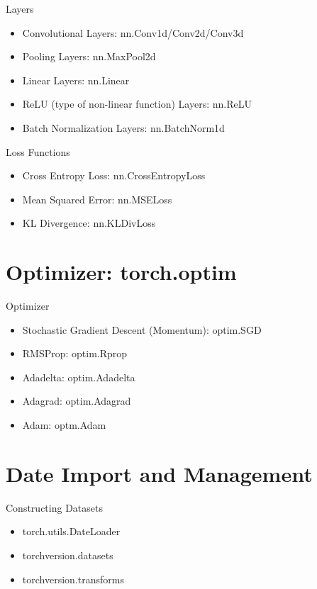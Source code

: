 \documentclass[english, nochinese]{../TeXTemplate/pkuslide}
\begin{document}
\begin{frame}
\sectionpage
\end{frame}

\begin{frame}{Layers}
\begin{itemize}
	\item Convolutional Layers: nn.Conv1d/Conv2d/Conv3d
	\item Pooling Layers: nn.MaxPool2d
	\item Linear Layers: nn.Linear
	\item ReLU (type of non-linear function) Layers: nn.ReLU
	\item Batch Normalization Layers: nn.BatchNorm1d
\end{itemize}
\end{frame}

\begin{frame}{Loss Functions}
\begin{itemize}
	\item Cross Entropy Loss: nn.CrossEntropyLoss
	\item Mean Squared Error: nn.MSELoss
	\item KL Divergence: nn.KLDivLoss
\end{itemize}
\end{frame}

\section{Optimizer: torch.optim}

\begin{frame}
\sectionpage
\end{frame}

\begin{frame}{Optimizer}
\begin{itemize}
	\item Stochastic Gradient Descent (Momentum): optim.SGD
	\item RMSProp: optim.Rprop
	\item Adadelta: optim.Adadelta
	\item Adagrad: optim.Adagrad
	\item Adam: optm.Adam
\end{itemize}
\end{frame}
	
\section{Date Import and Management}

\begin{frame}
\sectionpage
\end{frame}

\begin{frame}{Constructing Datasets}
\begin{itemize}
	\item torch.utils.DateLoader
	\item torchversion.datasets
	\item torchversion.transforms
\end{itemize}
\end{frame}
\end{document}
